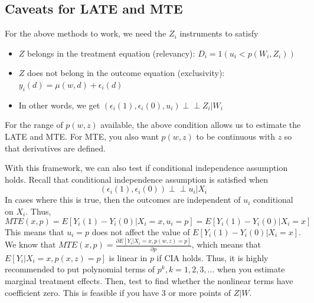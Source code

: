 \documentclass[12pt]{article}
\theoremstyle{definition}
\theoremstyle{property}
\theoremstyle{assumption}
\theoremstyle{example}
\theoremstyle{comment}
\begin{document}
\subsection{Caveats for LATE and MTE}
For the above methods to work, we need the $Z_i$ instruments to satisfy
\begin{itemize}
\item $Z$ belongs in the treatment equation (relevancy): $D_i=1(u_i<p(W_i,Z_i))$
\item $Z$ does not belong in the outcome equation (exclusivity): $y_i(d)=\mu(w,d)+\epsilon_i(d)$
\item In other words, we get $(\epsilon_i(1), \epsilon_i(0), u_i) \perp\!\!\!\perp Z_i|W_i$
\end{itemize}
For the range of $p(w,z)$ available, the above condition allows us to estimate the LATE and MTE. For MTE, you also want $p(w,z)$ to be continuous with $z$ so that derivatives are defined.  \par
With this framework, we can also test if conditional independence assumption holds. Recall that conditional independence assumption is satisfied when
\[
(\epsilon_i(1),\epsilon_i(0)) \perp\!\!\!\perp u_i|X_i
\]
In cases where this is true, then the outcomes are independent of $u_i$ conditional on $X_i$. Thus, 
\[
MTE(x,p)=E[Y_i(1)-Y_i(0)|X_i=x, u_i=p]=E[Y_i(1)-Y_i(0)|X_i=x]
\]
This means that $u_i=p$ does not affect the value of $E[Y_i(1)-Y_i(0)|X_i=x]$. We know that $MTE(x,p)=\frac{\partial E[Y_i | X_i=x, p(w, z)=p]}{\partial p}$, which means that $E[Y_i|X_i=x, p(x, z)=p]$ is linear in $p$ if CIA holds. Thus, it is highly recommended to put polynomial terms of $p^k, k=1,2,3,...$ when you estimate marginal treatment effects. Then, test to find whether the nonlinear terms have coefficient zero. This is feasible if you have 3 or more points of $Z|W$.
\end{document}
